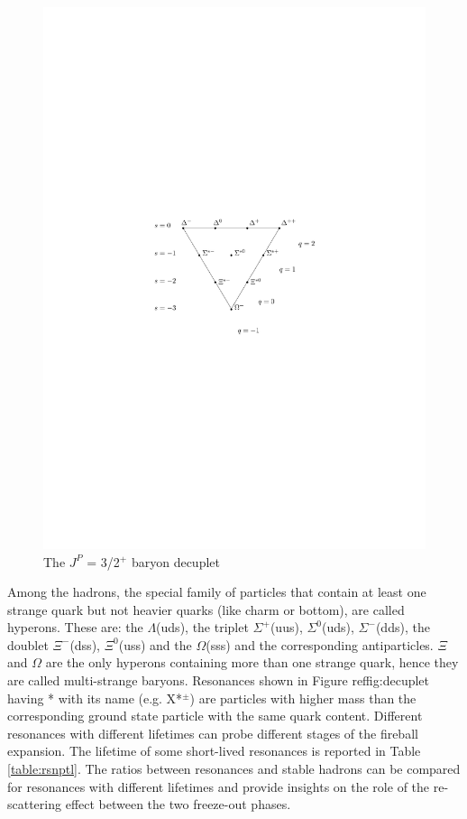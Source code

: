 \begin{figure}[htbp]
\begin{center}
\includegraphics[width=10.cm]{./Version1/FigChapter3/Decuplet}
\caption{ The $J^{P}$ = 3/2$^{+}$ baryon decuplet}
\label{fig:decuplet}
\end{center}
\end{figure}

Among the hadrons, the special family of particles that contain at least one strange quark but not heavier quarks (like charm or bottom), are called hyperons. These are: the $\Lambda$(uds), the triplet $\Sigma^{+}$(uus), $\Sigma^{0}$(uds), $\Sigma^{-}$(dds), the doublet $\Xi^{-}$(dss), $\Xi^{0}$(uss) and the $\Omega$(sss) and the corresponding antiparticles. $\Xi$ and $\Omega$ are the only hyperons containing more than one strange quark, hence they are called multi-strange baryons. 
Resonances shown in Figure ref{fig:decuplet} having * with its name (e.g. X*$^{\pm}$) are particles with higher mass than the corresponding ground state particle with the same quark content. 
Different resonances with different lifetimes can probe different stages of the fireball expansion. The lifetime of some short-lived resonances is reported in Table \ref{table:rsnptl}. The ratios between resonances and stable hadrons can be compared for resonances with different lifetimes and provide insights on the role of the re-scattering effect between the two freeze-out phases.


